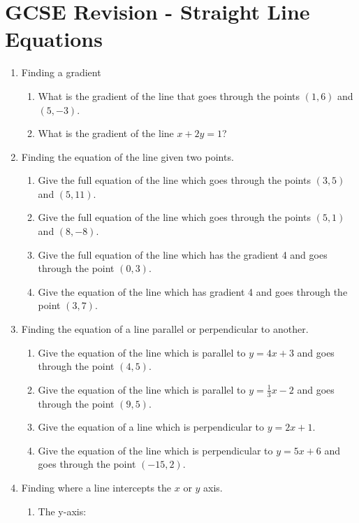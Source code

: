 \chapter{GCSE Revision - Straight Line Equations}

\begin{enumerate}
  \item Finding a gradient
  \begin{enumerate}
    \item What is the gradient of the line that goes through the points $(1,6)$ and $(5,-3)$.\strch
    \item What is the gradient of the line $x + 2y = 1$?\strch
  \end{enumerate}
  \item Finding the equation of the line given two points.
  \begin{enumerate}
    \item Give the full equation of the line which goes through the points $(3,5)$ and $(5,11)$.\strch
    \item Give the full equation of the line which goes through the points $(5,1)$ and $(8,-8)$.\strch
    \item Give the full equation of the line which has the gradient 4 and goes through the point $(0,3)$.\strch
    \item Give the equation of the line which has gradient 4 and goes through the point $(3,7)$.\strch
  \end{enumerate}
  \newpage
  \item Finding the equation of a line parallel or perpendicular to another.
  \begin{enumerate}
    \item Give the equation of the line which is parallel to $y = 4x + 3$ and goes through the point $(4,5)$.\strch
    \item Give the equation of the line which is parallel to $y = \frac{1}{3} x - 2$ and goes through the point $(9,5)$.\strch
    \item Give the equation of a line which is perpendicular to $y = 2x + 1$.\strch
    \item Give the equation of the line which is perpendicular to $y = 5x + 6$ and goes through the point $(-15,2)$.\strch
  \end{enumerate}
  \item Finding where a line intercepts the $x$ or $y$ axis.
  \begin{enumerate}
    \item The y-axis:\strch

\end{enumerate}
\end{enumerate}

